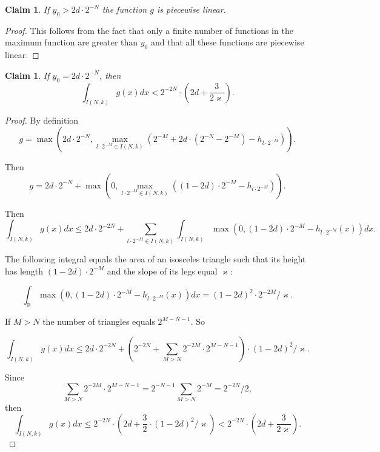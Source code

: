 \documentclass[12pt]{article}
\newtheorem{clai}[prop]{Claim}
\theoremstyle{definition}
\begin{document}
\begin{clai}
\label{piecewise-linear-g}
If $y_0>2d\cdot2^{-N}$ the function $g$ is piecewise linear.
\end{clai}
\begin{proof}
This follows from the fact that only a finite number of functions in the maximum function are greater than $y_0$ and that all these functions are piecewise linear.
\end{proof}


\begin{clai}
\label{g-integral}
If $y_0 = 2d\cdot2^{-N}$, then
$$
\int_{I(N,k)} g(x)dx < 2^{-2N}\cdot\left(2d + \frac3{2\varkappa}\right).
$$
\end{clai}

\begin{proof}
By definition
$$
g = \max\left(2d\cdot2^{-N},  \max\limits_{l\cdot2^{-M}\in I(N,k)}\left(2^{-M} + 2d\cdot\left(2^{-N} - 2^{-M}\right) -h_{l\cdot2^{-M}}\right)\right).
$$

Then
$$
g =2d\cdot2^{-N} + \max\left(0,  \max\limits_{l\cdot2^{-M}\in I(N,k)}\left((1-2d)\cdot2^{-M} -h_{l\cdot2^{-M}}\right)\right).
$$


Then
$$
\int_{I(N,k)} g(x)dx \le 2d\cdot2^{-2N} + \sum\limits_{l\cdot2^{-M}\in I(N,k)}\int_{I(N,k)}\max\left(0, (1-2d)\cdot2^{-M} -h_{l\cdot2^{-M}}(x)\right)dx.
$$

The following integral equals the area of an isosceles triangle such that its height has length $(1-2d)\cdot2^{-M}$ and the slope of its legs equal $\varkappa$:

$$
\int_{\mathbb R}\max\left(0, (1-2d)\cdot2^{-M} -h_{l\cdot2^{-M}}(x)\right)dx = (1-2d)^2\cdot2^{-2M}/\varkappa.
$$

If $M>N$ the number of triangles equals $2^{M-N-1}.$ So

$$
\int_{I(N,k)} g(x)dx \le
2d\cdot2^{-2N} + \left(2^{-2N} + \sum\limits_{M>N} 2^{-2M}\cdot 2^{M-N-1} \right)\cdot(1-2d)^2/\varkappa .
$$

Since
$$
\sum\limits_{M>N} 2^{-2M}\cdot 2^{M-N-1} = 2^{-N-1}\sum\limits_{M>N} 2^{-M} = 2^{-2N}/2,
$$
then
$$
\int_{I(N,k)} g(x)dx \le 2^{-2N}\cdot\left(2d + \frac32\cdot(1-2d)^2/\varkappa\right) < 2^{-2N}\cdot\left(2d + \frac3{2\varkappa}\right).
$$
\end{proof}
\end{document}
